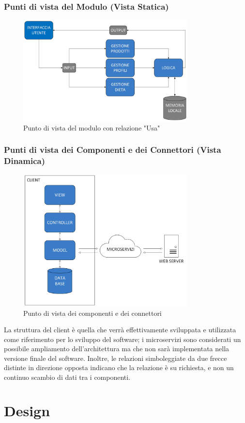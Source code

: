 \documentclass{article}
\begin{document}
\subsubsection{Punti di vista del Modulo (Vista Statica)}
\begin{figure}[H]
    \centering
    \includegraphics[width=0.8\textwidth]{imgs/VistaModuloUso.png}
    \caption{Punto di vista del modulo con relazione "Usa"}
    \label{fig:enter-label}
\end{figure}
\subsubsection{Punti di vista dei Componenti e dei Connettori (Vista Dinamica)}

\begin{figure}[H]
    \centering
    \includegraphics[width=0.8\textwidth]{imgs/Vista.png}
    \caption{Punto di vista dei componenti e dei connettori}
    \label{fig:enter-label}
\end{figure}

La struttura del client è quella che verrà effettivamente sviluppata e utilizzata come riferimento per lo sviluppo del software; i microservizi sono considerati un possibile ampliamento dell'architettura ma che non sarà implementata nella versione finale del software. Inoltre, le relazioni simboleggiate da due frecce distinte in direzione opposta indicano che la relazione è su richiesta, e non un continuo scambio di dati tra i componenti.  
\section{Design}
\end{document}
